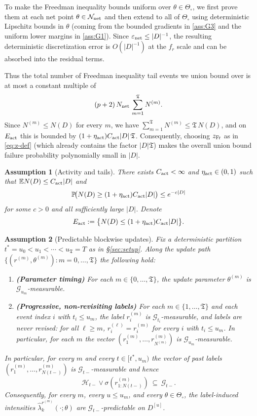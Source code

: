 \documentclass{statsoc}
\newtheorem{assumption}[assumption]{Assumption}
\newcommand{\bbE}{\mathbb{E}}
\newcommand{\bbP}{\mathbb{P}}
\newcommand{\1}{\mathbbm{1}}
\newcommand{\Tmax}{\mathfrak{T}}
\begin{document}
To make the Freedman inequality bounds uniform over $\theta\in\Theta_\circ$, we first prove them at each net point $\theta\in\mathcal N_{\rm net}$ and then extend to all of $\Theta_\circ$ using deterministic Lipschitz bounds in $\theta$ (coming from the bounded gradients in \cref{ass:G3} and the uniform lower margins in \cref{ass:G1}). Since $\varepsilon_{\rm net}\le |D|^{-1}$, the resulting deterministic discretization error is $O(|D|^{-1})$ at the $f_r$ scale and can be absorbed into the residual terms.

Thus the total number of Freedman inequality tail events we union bound over is at most a constant multiple of
\[
(p+2)\,N_{\rm net}\,\sum_{m=1}^{\Tmax} N^{(m)}.
\]
Since $N^{(m)}\le N(D)$ for every $m$, we have $\sum_{m=1}^{\Tmax}N^{(m)}\le \Tmax\,N(D)$, and on $E_{\rm act}$ this is
bounded by $(1+\eta_{\rm act})C_{\rm act}|D|\,\Tmax$. Consequently, choosing $z_{\rm Fr}$ as in \eqref{eq:z-def} (which already
contains the factor $|D|\Tmax$) makes the overall union bound failure probability polynomially small in $|D|$.


\begin{assumption}[Activity and tails]\label{ass:G0}
There exists $C_{\rm act}<\infty$ and $\eta_{\rm act}\in(0,1)$ such that $\bbE N(D)\le C_{\rm act}|D|$ and
\[
\bbP\!\big(N(D)\ge (1+\eta_{\rm act})C_{\rm act} |D|\big)\le e^{-c|D|}
\]
for some $c>0$ and all sufficiently large $|D|$. Denote
\[
E_{\rm act}:=\big\{N(D)\le (1+\eta_{\rm act})C_{\rm act} |D|\big\}.
\]
\end{assumption}

\begin{assumption}[Predictable blockwise updates]\label{ass:G0pred}
Fix a deterministic partition $t^\ast=u_0<u_1<\cdots<u_{\Tmax}=T$ as in \S\ref{sec:setup}.
Along the update path $\{(r^{(m)},\theta^{(m)}): m=0,\dots,\Tmax\}$ the following hold:

\begin{enumerate}[nosep,label=(\alph*)]
\item \textbf{(Parameter timing)} For each $m\in\{0,\dots,\Tmax\}$, the update parameter
$\theta^{(m)}$ is $\mathcal G_{u_m}$-measurable.

\item \textbf{(Progressive, non-revisiting labels)} For each $m\in\{1,\dots,\Tmax\}$ and each event index $i$ with
$t_i\le u_m$, the label $r_i^{(m)}$ is $\mathcal G_{t_i}$-measurable, and labels are never revised:
for all $\ell\ge m$, $r_i^{(\ell)}=r_i^{(m)}$ for every $i$ with $t_i\le u_m$.
In particular, for each $m$ the vector $(r_1^{(m)},\dots,r_{N^{(m)}}^{(m)})$ is $\mathcal G_{u_m}$-measurable.
\end{enumerate}

In particular, for every $m$ and every $t\in[t^\ast,u_m)$ the vector of past labels
$(r^{(m)}_1,\ldots,r^{(m)}_{N(t-)})$ is $\mathcal G_{t-}$-measurable and hence
\[
\mathcal H_{t-}\vee\sigma(r^{(m)}_{1:N(t-)})\ \subseteq\ \mathcal G_{t-}.
\]
Consequently, for every $m$, every $u\le u_m$, and every $\theta\in\Theta_\circ$,
the label-induced intensities $\widehat\lambda_k^{r^{(m)}}(\cdot;\theta)$ are $\mathcal G_{t-}$-predictable on $D^{[u]}$.
\end{assumption}
\end{document}
